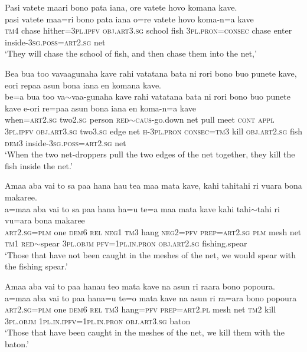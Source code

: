 \ea\label{ex:text23-13}
Pasi vatete maari bono pata iana, ore vatete hovo komana kave.\\
\gll pasi	vatete	maa=ri	bono	pata	iana	o=re	vatete	hovo	koma-n=a	kave\\
     \textsc{tm}4	chase	hither=3\textsc{pl}.\textsc{ipfv}	\textsc{obj}.\textsc{art}3.\textsc{sg}	school	fish	3\textsc{pl}.\textsc{pron}=\textsc{consec}	chase	enter	inside-3\textsc{sg}.\textsc{poss}=\textsc{art}2.\textsc{sg}	net\\
\glt `They will chase the school of fish, and then chase them into the net,'
\z

\ea\label{ex:text23-14}
Bea bua too vavaagunaha kave rahi vatatana bata ni rori bono buo punete kave, eori repaa asun bona iana en komana kave.\\
\gll be=a	bua	too	va{$\sim$}vaa-gunaha	kave	rahi	vatatana	bata	ni	rori	bono	buo	punete	kave	e-ori	re=paa	asun	bona	iana	en	koma-n=a	kave\\
     when=\textsc{art}2.\textsc{sg}	two2.\textsc{sg}	person	\textsc{red}{$\sim$}\textsc{caus}-go.down	net	pull	meet	\textsc{cont}	\textsc{appl}	3\textsc{pl}.\textsc{ipfv}	\textsc{obj}.\textsc{art}3.\textsc{sg}	two3.\textsc{sg}	edge	net	\textsc{h}-3\textsc{pl}.\textsc{pron}	\textsc{consec}=\textsc{tm}3	kill	\textsc{obj}.\textsc{art}2.\textsc{sg}	fish	\textsc{dem}3	inside-3\textsc{sg}.\textsc{poss}=\textsc{art}2.\textsc{sg}	net\\
\glt `When the two net-droppers pull the two edges of the net together, they kill the fish inside the net.'
\z

\ea\label{ex:text23-15}
Amaa aba vai to sa paa hana hau tea maa mata kave, kahi tahitahi ri vuara bona makaree.\\
\gll a=maa	aba	vai	to	sa	paa	hana	ha=u	te=a	maa	mata	kave	kahi	tahi{$\sim$}tahi	ri	vu=ara	bona	makaree\\
     \textsc{art}2.\textsc{sg}=\textsc{plm}	one	\textsc{dem}6	\textsc{rel}	\textsc{neg}1	\textsc{tm}3	hang	\textsc{neg}2=\textsc{pfv}	\textsc{prep}=\textsc{art}2.\textsc{sg}	\textsc{plm}	mesh	net	\textsc{tm}1	\textsc{red}{$\sim$}spear	3\textsc{pl}.\textsc{objm}	\textsc{pfv}=1\textsc{pl}.\textsc{in}.\textsc{pron}	\textsc{obj}.\textsc{art}2.\textsc{sg}	fishing.spear\\
\glt `Those that have not been caught in the meshes of the net, we would spear with the fishing spear.'
\z

\ea\label{ex:text23-16}
Amaa aba vai to paa hanau teo mata kave na asun ri raara bono popoura.\\
\gll a=maa	aba	vai	to	paa	hana=u	te=o	mata	kave	na	asun	ri	ra=ara	bono	popoura\\
     \textsc{art}2.\textsc{sg}=\textsc{plm}	one	\textsc{dem}6	\textsc{rel}	\textsc{tm}3	hang=\textsc{pfv}	\textsc{prep}=\textsc{art}2.\textsc{pl}	mesh	net	\textsc{tm}2	kill	3\textsc{pl}.\textsc{objm}	1\textsc{pl}.\textsc{in}.\textsc{ipfv}=1\textsc{pl}.\textsc{in}.\textsc{pron}	\textsc{obj}.\textsc{art}3.\textsc{sg}	baton\\
\glt `Those that have been caught in the meshes of the net, we kill them with the baton.'
\z

